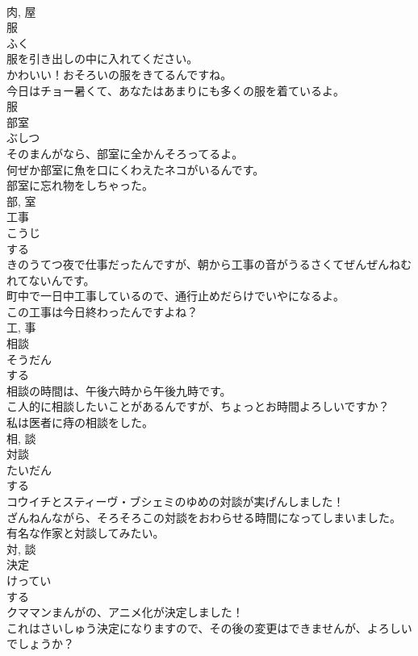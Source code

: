\documentclass[8pt]{extreport}
\begin{document}
\begin{CJK}{UTF8}{min}
\\	肉, 屋	
\\	服	
\\	ふく	
\\	服を引き出しの中に入れてください。	
\\	かわいい！おそろいの服をきてるんですね。	
\\	今日はチョー暑くて、あなたはあまりにも多くの服を着ているよ。	
\\	服	
\\	部室	
\\	ぶしつ	
\\	そのまんがなら、部室に全かんそろってるよ。	
\\	何ぜか部室に魚を口にくわえたネコがいるんです。	
\\	部室に忘れ物をしちゃった。	
\\	部, 室	
\\	工事	
\\	こうじ	
\\	する 
\\	きのうてつ夜で仕事だったんですが、朝から工事の音がうるさくてぜんぜんねむれてないんです。	
\\	町中で一日中工事しているので、通行止めだらけでいやになるよ。	
\\	この工事は今日終わったんですよね？	
\\	工, 事	
\\	相談	
\\	そうだん	
\\	する 
\\	相談の時間は、午後六時から午後九時です。	
\\	こ人的に相談したいことがあるんですが、ちょっとお時間よろしいですか？	
\\	私は医者に痔の相談をした。	
\\	相, 談	
\\	対談	
\\	たいだん	
\\	する 
\\	コウイチとスティーヴ・ブシェミのゆめの対談が実げんしました！	
\\	ざんねんながら、そろそろこの対談をおわらせる時間になってしまいました。	
\\	有名な作家と対談してみたい。	
\\	対, 談	
\\	決定	
\\	けってい	
\\	する 
\\	クママンまんがの、アニメ化が決定しました！	
\\	これはさいしゅう決定になりますので、その後の変更はできませんが、よろしいでしょうか？	

\end{CJK}
\end{document}
